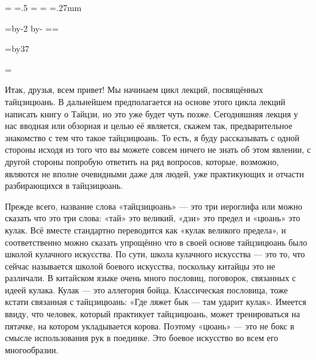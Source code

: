\pdfpagewidth=297mm
\pdfpageheight=210mm
\pdfhorigin=1in
\pdfvorigin=0pt

\shhtotal=\pdfpagewidth
\htotal=.5\shhtotal
\vtotal=\pdfpageheight
\shoutline=0pt
\shstaplewidth=0pt
\shcrop=0pt
\shfootline={}
\shthickness=.27mm
\qtwopages \shipout\vbox{}

\horigin=10mm
\hsize=\htotal \advance\hsize by-2\horigin
\advance\hsize by-\QUIRE
\output={\ifodd\pageno\else\hoffset=\QUIRE\fi \plainoutput}

\vorigin=7mm
\vsize=\topskip \advance\vsize by37\baselineskip

\footline={\line{\hss\tenrm\folio\hss}}


Итак, друзья, всем привет! Мы начинаем цикл лекций, посвящённых тайцзицюань. В дальнейшем 
предполагается на основе этого цикла лекций написать книгу о Тайцзи, но это уже будет чуть 
позже. Сегодняшняя лекция у нас вводная или обзорная и целью её является, скажем так,
предварительное знакомство с тем что такое тайцзицюань. То есть, я буду рассказывать с одной 
стороны исходя из того что вы можете совсем ничего не знать об этом явлении, с другой стороны 
попробую ответить на ряд вопросов, которые, возможно, являются не вполне очевидными даже для 
людей, уже практикующих и отчасти разбирающихся в тайцзицюань.

Прежде всего, название слова 
«тайцзицюань» --- это три иероглифа или можно сказать что это три слова: «тай» это великий, «дзи» 
это предел и «цюань» это кулак. Всё вместе стандартно переводится как «кулак великого предела», и 
соответственно можно сказать упрощённо что в своей основе тайцзицюань было школой 
кулачного искусства. По сути, школа кулачного искусства --- это то, что сейчас называется школой 
боевого искусства, поскольку китайцы это не различали. В китайском языке очень много 
пословиц, поговорок, связанных с идеей кулака. Кулак --- это аллегория бойца.
Классическая 
пословица, тоже кстати связанная с тайцзицюань: «Где ляжет бык --- там ударит кулак».
Имеется ввиду,
что человек, который практикует тайцзицюань, может тренироваться на пятачке, на котором 
укладывается корова. Поэтому «цюань» --- это не бокс в смысле использования рук в поединке. Это 
боевое искусство во всем его многообразии.

